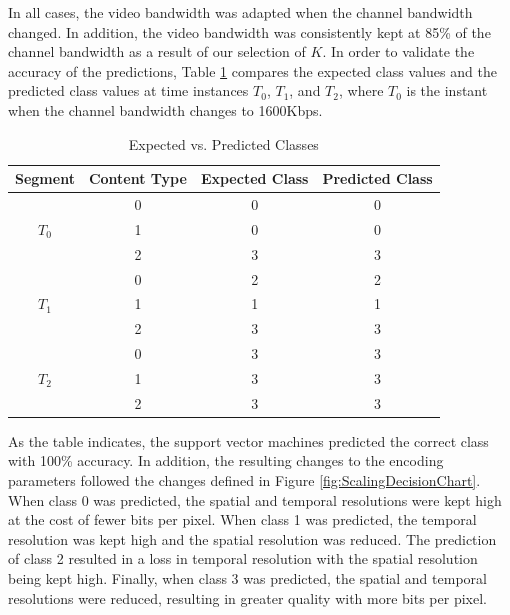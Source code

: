 \documentclass[3p,times,procedia]{elsarticle}
\begin{document}
In all cases, the video bandwidth was adapted when the channel bandwidth changed. In addition, the video bandwidth was consistently kept at 85\% of the channel bandwidth as a result of our selection of $K$. In order to validate the accuracy of the predictions, Table \ref{tab:PredictedClasses} compares the expected class values and the predicted class values at time instances $T_0$, $T_1$, and $T_2$, where $T_0$ is the instant when the channel bandwidth changes to 1600Kbps.
\begin{table} [H]
\centering
\caption{Expected vs. Predicted Classes}
\label{tab:PredictedClasses}
\begin{tabular}{c|c|c|c}
\textbf{Segment}&\textbf{Content Type}&\textbf{Expected Class}&\textbf{Predicted Class}\\
\hline
&0&0&0\\
$T_0$&1&0&0\\
&2&3&3\\
\hline
&0&2&2\\
$T_1$&1&1&1\\
&2&3&3\\
\hline
&0&3&3\\
$T_2$&1&3&3\\
&2&3&3\\
\end{tabular}
\end{table} 
As the table indicates, the support vector machines predicted the correct class with 100\% accuracy. In addition, the resulting changes to the encoding parameters followed the changes defined in Figure \ref{fig:ScalingDecisionChart}. When class 0 was predicted, the spatial and temporal resolutions were kept high at the cost of fewer bits per pixel. When class 1 was predicted, the temporal resolution was kept high and the spatial resolution was reduced. The prediction of class 2 resulted in a loss in temporal resolution with the spatial resolution being kept high. Finally, when class 3 was predicted, the spatial and temporal resolutions were reduced, resulting in greater quality with more bits per pixel. 
\end{document}
